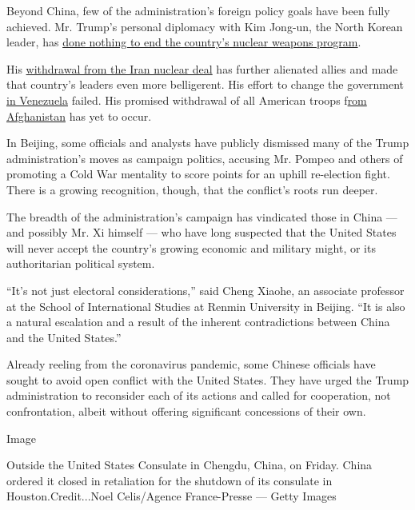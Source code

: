 Beyond China, few of the administration's foreign policy goals have been
fully achieved. Mr. Trump's personal diplomacy with Kim Jong-un, the
North Korean leader, has
\href{https://www.nytimes3xbfgragh.onion/2020/06/12/world/asia/korea-nuclear-trump-kim.html?searchResultPosition=5}{done
nothing to end the country's nuclear weapons program}.

His
\href{https://www.nytimes3xbfgragh.onion/2018/05/08/us/politics/trump-speech-iran-deal.html?searchResultPosition=40}{withdrawal
from the Iran nuclear deal} has further alienated allies and made that
country's leaders even more belligerent. His effort to change the
government
\href{https://www.nytimes3xbfgragh.onion/2020/03/31/world/americas/coronavirus-venezuela-maduro-guaido.html?searchResultPosition=2}{in
Venezuela} failed. His promised withdrawal of all American troops
f\href{https://www.nytimes3xbfgragh.onion/2020/05/26/world/asia/afghanistan-troop-withdrawal-election-day.html?searchResultPosition=2}{rom
Afghanistan} has yet to occur.

In Beijing, some officials and analysts have publicly dismissed many of
the Trump administration's moves as campaign politics, accusing Mr.
Pompeo and others of promoting a Cold War mentality to score points for
an uphill re-election fight. There is a growing recognition, though,
that the conflict's roots run deeper.

The breadth of the administration's campaign has vindicated those in
China --- and possibly Mr. Xi himself --- who have long suspected that
the United States will never accept the country's growing economic and
military might, or its authoritarian political system.

``It's not just electoral considerations,'' said Cheng Xiaohe, an
associate professor at the School of International Studies at Renmin
University in Beijing. ``It is also a natural escalation and a result of
the inherent contradictions between China and the United States.''

Already reeling from the coronavirus pandemic, some Chinese officials
have sought to avoid open conflict with the United States. They have
urged the Trump administration to reconsider each of its actions and
called for cooperation, not confrontation, albeit without offering
significant concessions of their own.

Image

Outside the United States Consulate in Chengdu, China, on Friday. China
ordered it closed in retaliation for the shutdown of its consulate in
Houston.Credit...Noel Celis/Agence France-Presse --- Getty Images

